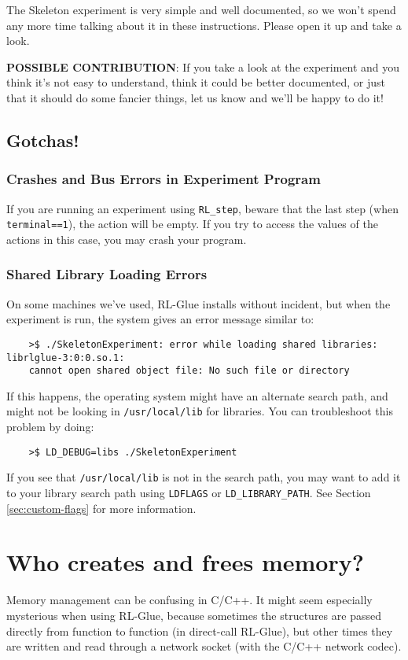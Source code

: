 \documentclass[11pt]{article}
\begin{document}
The Skeleton experiment is very simple and well documented, so we won't spend any more time talking about it in these instructions.
Please open it up and take a look.

\textbf{POSSIBLE CONTRIBUTION}: If you take a look at the experiment and you think it's not easy to understand, think it could be better documented, 
or just that it should do some fancier things, let us know and we'll be happy to do it!

\subsection{Gotchas!}
\subsubsection{Crashes and Bus Errors in Experiment Program}
If you are running an experiment using \texttt{RL\_step}, beware that the last step (when \texttt{terminal==1}), the action will be empty.  If you try to access the values of the actions in this 
case, you may crash your program.

\subsubsection{Shared Library Loading Errors}
\label{sec:gotchas-shared-libs}
On some machines we've used, RL-Glue installs without incident, but when the experiment is run, the system gives an error message similar to:
\begin{verbatim}
	>$ ./SkeletonExperiment: error while loading shared libraries: librlglue-3:0:0.so.1:
	cannot open shared object file: No such file or directory
\end{verbatim}

If this happens, the operating system might have an alternate search path, and might not be looking in \texttt{/usr/local/lib} for libraries. 
You can troubleshoot this problem by doing:
\begin{verbatim}
	>$ LD_DEBUG=libs ./SkeletonExperiment
\end{verbatim}
If you see that \texttt{/usr/local/lib} is not in the search path, you may want to add it to your library search path using \texttt{LDFLAGS} or \texttt{LD\_LIBRARY\_PATH}.  See Section \ref{sec:custom-flags} for more information.  




\section{Who creates and frees memory?}
Memory management can be confusing in C/C++.  It might seem especially mysterious when using RL-Glue, because sometimes the structures are passed directly 
from function to function (in direct-call RL-Glue), but other times they are written and read through a network socket (with the C/C++ network codec).
\end{document}
